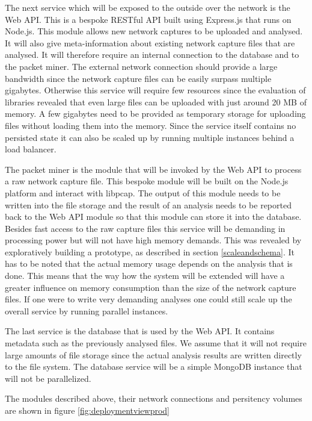 The next service which will be exposed to the outside over the network is the Web API. This is a bespoke RESTful API built using Express.js that runs on Node.js. This module allows new network captures to be uploaded and analysed. It will also give meta-information about existing network capture files that are analysed. It will therefore require an internal connection to the database and to the packet miner. The external network connection should provide a large bandwidth since the network capture files can be easily surpass multiple gigabytes. Otherwise this service will require few resources since the evaluation of libraries revealed that even large files can be uploaded with just around 20 MB of memory. A few gigabytes need to be provided as temporary storage for uploading files without loading them into the memory. Since the service itself contains no persisted state it can also be scaled up by running multiple instances behind a load balancer.

The packet miner is the module that will be invoked by the Web API to process a raw network capture file. This bespoke module will be built on the Node.js platform and interact with libpcap. The output of this module needs to be written into the file storage and the result of an analysis needs to be reported back to the Web API module so that this module can store it into the database. Besides fast access to the raw capture files this service will be demanding in processing power but will not have high memory demands. This was revealed by exploratively building a prototype, as described in section \ref{scaleandschema}. It has to be noted that the actual memory usage depends on the analysis that is done. This means that the way how the system will be extended will have a greater influence on memory consumption than the size of the network capture files. If one were to write very demanding analyses one could still scale up the overall service by running parallel instances.

 The last service is the database that is used by the Web API. It contains metadata such as the previously analysed files. We assume that it will not require large amounts of file storage since the actual analysis results are written directly to the file system. The database service will be a simple MongoDB instance that will not be parallelized.
 
 The modules described above, their network connections and persitency volumes are shown in figure \ref{fig:deploymentviewprod}



